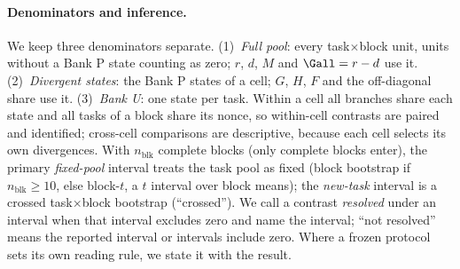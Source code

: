 \paragraph{Denominators and inference.} We keep three denominators separate. (1)~\emph{Full pool}: every task$\times$block unit, units without a Bank P state counting as zero; $r$, $d$, $M$ and $\Gall=r-d$ use it. (2)~\emph{Divergent states}: the Bank P states of a cell; $G$, $H$, $F$ and the off-diagonal share use it. (3)~\emph{Bank U}: one state per task. Within a cell all branches share each state and all tasks of a block share its nonce, so within-cell contrasts are paired and identified; cross-cell comparisons are descriptive, because each cell selects its own divergences. With $n_{\mathrm{blk}}$ complete blocks (only complete blocks enter), the primary \emph{fixed-pool} interval treats the task pool as fixed (block bootstrap if $n_{\mathrm{blk}}\ge10$, else block-$t$, a $t$ interval over block means); the \emph{new-task} interval is a crossed task$\times$block bootstrap (``crossed''). We call a contrast \emph{resolved} under an interval when that interval excludes zero and name the interval; ``not resolved'' means the reported interval or intervals include zero. Where a frozen protocol sets its own reading rule, we state it with the result. %
